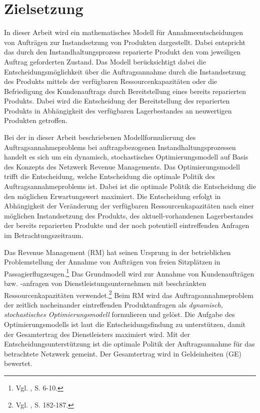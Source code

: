 \section{Zielsetzung}

In dieser Arbeit wird ein mathematisches Modell für Annahmeentscheidungen von Aufträgen zur Instandsetzung von Produkten dargestellt. Dabei entspricht das durch den Instandhaltungsprozess reparierte Produkt den vom jeweiligen Auftrag geforderten Zustand. Das Modell berücksichtigt dabei die Entscheidungsmöglichkeit über die Auftragsannahme durch die Instandsetzung des Produkts mittels der verfügbaren Ressourcenkapazitäten oder die Befriedigung des Kundenauftrags durch Bereitstellung eines bereits reparierten Produkts. Dabei wird die Entscheidung der Bereitstellung des reparierten Produkts in Abhängigkeit des verfügbaren Lagerbestandes an neuwertigen Produkten getroffen.

Bei der in dieser Arbeit beschriebenen Modellformulierung des Auftragsannahmeproblems bei auftragsbezogenen Instandhaltungsprozessen handelt es sich um ein dynamisch, stochastisches Optimierungsmodell auf Basis des Konzepts des Netzwerk Revenue Managements. Das Optimierungsmodell trifft die Entscheidung, welche Entscheidung die optimale Politik des Auftragsannahmeproblems ist. Dabei ist die optimale Politik die Entscheidung die den möglichen Erwartungswert maximiert. Die Entscheidung erfolgt in Abhängigkeit der Veränderung der verfügbaren Ressourcenkapazitäten nach einer möglichen Instandsetzung des Produkts, des aktuell-vorhandenen Lagerbestandes der bereits reparierten Produkte und der noch potentiell eintreffenden Anfragen im Betrachtungszeitraum.

Das Revenue Management (RM) hat seinen Ursprung in der betrieblichen Problemstellung der Annahme von Aufträgen von freien Sitzplätzen in Passagierflugzeugen.\footnote{Vgl. \cite{talluri2004theory}, S. 6-10.} Das Grundmodell wird zur Annahme von Kundenaufträgen bzw. -anfragen von Dienstleistungsunternehmen mit beschränkten Ressourcenkapazitäten verwendet.\footnote{Vgl. \cite{Petrick:2009aa}, S. 182-187.} %
Beim RM wird das Auftragsannahmeproblem der zeitlich nacheinander eintreffenden Produktanfragen als \textit{dynamisch, stochastisches Optimierungsmodell} formulieren und gelöst.
Die Aufgabe des Optimierungsmodells ist laut \cite{talluri2004theory} die Entscheidungsfindung zu unterstützen, damit der Gesamtertrag des Dienstleisters maximiert wird. Mit der Entscheidungsunterstützung ist die optimale Politik der Auftragsannahme für das betrachtete Netzwerk gemeint. Der Gesamtertrag wird in Geldeinheiten (GE) bewertet. 

